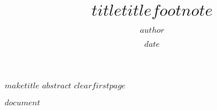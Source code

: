 \documentclass[10pt,$papersize$]{article}
\title{{\mylcmss\bfseries $title$}$titlefootnote$}
\author{$author$}
\date{$date$}
\begin{document}
\pagestyle{myheadings}

$maketitle$
$abstract$
$clearfirstpage$

$document$
\end{document}
